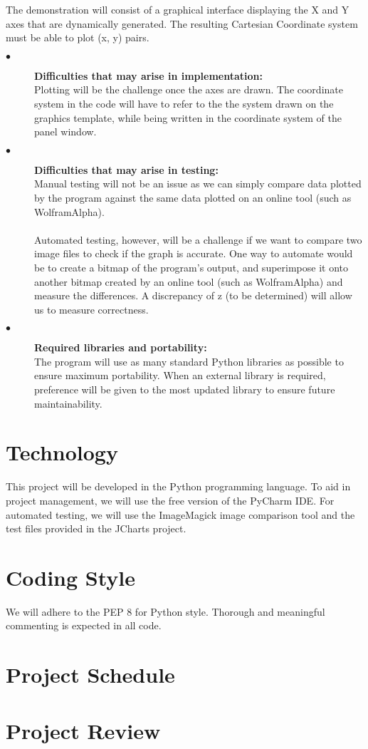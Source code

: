 \documentclass{article}
\begin{document}
The demonstration will consist of a graphical interface displaying the X and Y axes that are dynamically generated. The resulting Cartesian Coordinate system must be able to plot (x, y) pairs. 
\begin{description}
  \item[$\bullet$]  \textbf{Difficulties that may arise in implementation:} \\
  	Plotting will be the challenge once the axes are drawn. The coordinate system in the code will have to refer to the the system drawn on the graphics template, while being written in the coordinate system of the panel window. 

\item[$\bullet$]  \textbf{Difficulties that may arise in testing:} \\
Manual testing will not be an issue as we can simply compare data plotted by the program against the same data plotted on an online tool (such as WolframAlpha).\\ \\
Automated testing, however, will be a challenge if we want to compare two image files to check if the graph is accurate. One way to automate would be to create a bitmap of the program's output, and superimpose it onto another bitmap created by an online tool (such as WolframAlpha) and measure the differences. A discrepancy of z (to be determined) will allow us to measure correctness. 

\item[$\bullet$]  \textbf{Required libraries and portability:} \\
The program will use as many standard Python libraries as possible to ensure maximum portability. When an external library is required, preference will be given to the most updated library to ensure future maintainability. 

\end{description}

\section{Technology} %
This project will be developed in the Python programming language. To aid in project management, we will use the free version of the PyCharm IDE.  For automated testing, we will use the ImageMagick image comparison tool and the test files provided in the JCharts project.

\section{Coding Style} %
We will adhere to the PEP 8 for Python style. Thorough and meaningful commenting is expected in all code.

\section{Project Schedule}


\section{Project Review} 
\end{document}
